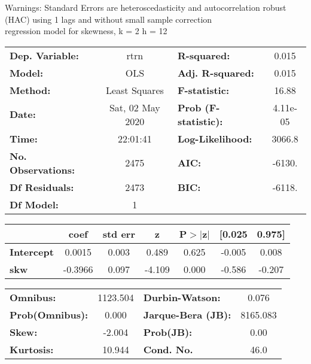 Warnings: \newline
 [1] Standard Errors are heteroscedasticity and autocorrelation robust (HAC) using 1 lags and without small sample correction\\ 

regression model for skewness, k = 2 h = 12\begin{center}
\begin{tabular}{lclc}
\toprule
\textbf{Dep. Variable:}    &       rtrn       & \textbf{  R-squared:         } &     0.015   \\
\textbf{Model:}            &       OLS        & \textbf{  Adj. R-squared:    } &     0.015   \\
\textbf{Method:}           &  Least Squares   & \textbf{  F-statistic:       } &     16.88   \\
\textbf{Date:}             & Sat, 02 May 2020 & \textbf{  Prob (F-statistic):} &  4.11e-05   \\
\textbf{Time:}             &     22:01:41     & \textbf{  Log-Likelihood:    } &    3066.8   \\
\textbf{No. Observations:} &        2475      & \textbf{  AIC:               } &    -6130.   \\
\textbf{Df Residuals:}     &        2473      & \textbf{  BIC:               } &    -6118.   \\
\textbf{Df Model:}         &           1      & \textbf{                     } &             \\
\bottomrule
\end{tabular}
\begin{tabular}{lcccccc}
                   & \textbf{coef} & \textbf{std err} & \textbf{z} & \textbf{P$> |$z$|$} & \textbf{[0.025} & \textbf{0.975]}  \\
\midrule
\textbf{Intercept} &       0.0015  &        0.003     &     0.489  &         0.625        &       -0.005    &        0.008     \\
\textbf{skw}       &      -0.3966  &        0.097     &    -4.109  &         0.000        &       -0.586    &       -0.207     \\
\bottomrule
\end{tabular}
\begin{tabular}{lclc}
\textbf{Omnibus:}       & 1123.504 & \textbf{  Durbin-Watson:     } &    0.076  \\
\textbf{Prob(Omnibus):} &   0.000  & \textbf{  Jarque-Bera (JB):  } & 8165.083  \\
\textbf{Skew:}          &  -2.004  & \textbf{  Prob(JB):          } &     0.00  \\
\textbf{Kurtosis:}      &  10.944  & \textbf{  Cond. No.          } &     46.0  \\
\bottomrule
\end{tabular}
\end{center}

